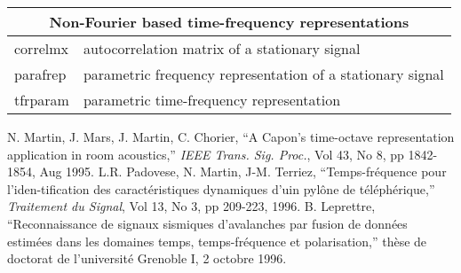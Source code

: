 \documentclass[12pt,a4paper]{report}
\newcommand{\ty}{\ttfamily}
\begin{document}
\vspace{2 cm}

\begin{tabular}{|p{2 cm} p{10cm}|}
\hline
\multicolumn{2}{|c|}{\bf Non-Fourier based time-frequency representations}\\
\hline
 {\ty correlmx} &  autocorrelation matrix of a stationary signal\\
 {\ty parafrep} &  parametric frequency representation of a stationary signal\\
 {\ty tfrparam} &  parametric time-frequency representation \\\hline
\end{tabular}

\newpage
\newpage
\begin{thebibliography}{99}
 N. Martin, J. Mars, J. Martin, C. Chorier,
``A Capon's time-octave representation application in room acoustics,''
\emph{IEEE Trans. Sig. Proc.}, Vol 43, No 8, pp 1842-1854, Aug 1995.
 L.R. Padovese, N. Martin, J-M. Terriez,
``Temps-fr\'equence pour l'iden-tification des caract\'eristiques dynamiques
d'uin pyl\^one de t\'el\'eph\'erique,'' \emph{Traitement du Signal}, Vol 13, No 3,
pp 209-223, 1996.
 B. Leprettre, ``Reconnaissance de signaux sismiques 
d'avalanches par fusion de donn\'ees estim\'ees dans les domaines temps,
temps-fr\'equence et polarisation,'' th\`ese de doctorat de l'universit\'e 
Grenoble I, 2 octobre 1996.
\end{thebibliography}
\end{document}
